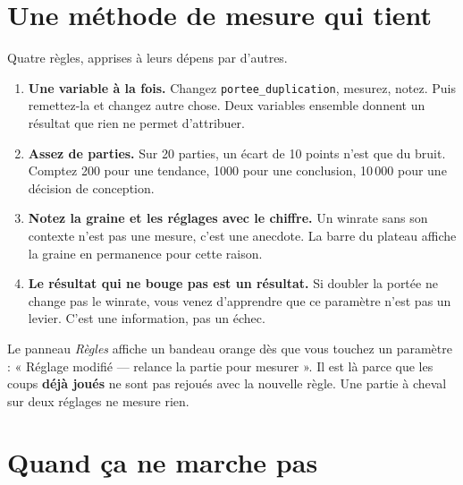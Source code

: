 \section{Une méthode de mesure qui tient}

Quatre règles, apprises à leurs dépens par d'autres.

\begin{enumerate}
  \item \textbf{Une variable à la fois.} Changez \texttt{portee\_duplication},
        mesurez, notez. Puis remettez-la et changez autre chose. Deux variables
        ensemble donnent un résultat que rien ne permet d'attribuer.
  \item \textbf{Assez de parties.} Sur 20 parties, un écart de 10 points n'est que
        du bruit. Comptez 200 pour une tendance, 1000 pour une conclusion, 10\,000
        pour une décision de conception.
  \item \textbf{Notez la graine et les réglages avec le chiffre.} Un winrate sans
        son contexte n'est pas une mesure, c'est une anecdote. La barre du plateau
        affiche la graine en permanence pour cette raison.
  \item \textbf{Le résultat qui ne bouge pas est un résultat.} Si doubler la
        portée ne change pas le winrate, vous venez d'apprendre que ce paramètre
        n'est pas un levier. C'est une information, pas un échec.
\end{enumerate}

\begin{nkpiege}
Le panneau \emph{Règles} affiche un bandeau orange dès que vous touchez un
paramètre : « Réglage modifié — relance la partie pour mesurer ». Il est là parce
que les coups \textbf{déjà joués} ne sont pas rejoués avec la nouvelle règle. Une
partie à cheval sur deux réglages ne mesure rien.
\end{nkpiege}

\section{Quand ça ne marche pas}

